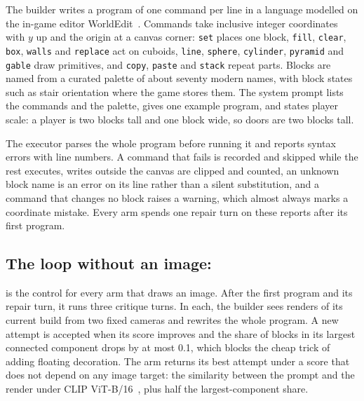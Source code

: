 The builder writes a program of one command per line in a language modelled on the in-game
editor WorldEdit~\citep{worldedit}. Commands take inclusive integer coordinates with $y$ up and
the origin at a canvas corner: \texttt{set} places one block, \texttt{fill}, \texttt{clear},
\texttt{box}, \texttt{walls} and \texttt{replace} act on cuboids, \texttt{line},
\texttt{sphere}, \texttt{cylinder}, \texttt{pyramid} and \texttt{gable} draw primitives, and
\texttt{copy}, \texttt{paste} and \texttt{stack} repeat parts. Blocks are named from a curated
palette of about seventy modern names, with block states such as stair orientation where the game
stores them. The system prompt lists the commands and the palette, gives one example program, and
states player scale: a player is two blocks tall and one block wide, so doors are two blocks tall.

The executor parses the whole program before running it and reports syntax errors with line
numbers. A command that fails is recorded and skipped while the rest executes, writes outside the
canvas are clipped and counted, an unknown block name is an error on its line rather than a
silent substitution, and a command that changes no block raises a warning, which almost always
marks a coordinate mistake. Every arm spends one repair turn on these reports after its first
program.

\subsection{The loop without an image: \classicm{}}
\label{sec:classic}

\classicm{} is the control for every arm that draws an image. After the first program and its
repair turn, it runs three critique turns. In each, the builder sees renders of its current build
from two fixed cameras and rewrites the whole program. A new attempt is accepted when its score
improves and the share of blocks in its largest connected component drops by at most 0.1, which
blocks the cheap trick of adding floating decoration. The arm returns its best attempt under a
score that does not depend on any image target: the similarity between the prompt and the render
under CLIP ViT-B/16~\citep{radford2021clip}, plus half the largest-component share.

